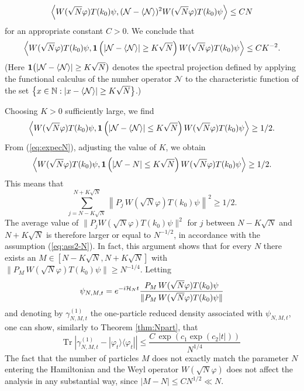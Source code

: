 \documentclass[11pt,a4paper]{article}
\newcommand{\tr}{\mbox{Tr}}
\newcommand{\cH}{{\cal H}}
\newcommand{\cN}{{\cal N}}
\newcommand{\Ncal}{\mathcal{N}}		%
\newcommand{\Nbb}{\mathbb{N}}		%
\begin{document}
\begin{itemize}
 \[ \left\langle W(\sqrt{N} \varphi) T(k_0) \psi, (\cN - \langle \cN \rangle)^2 W(\sqrt{N} \varphi) T(k_0) \psi \right\rangle \leq C N \]
for an appropriate constant $C >0$. We conclude that
\[  \left\langle W(\sqrt{N} \varphi) T(k_0) \psi,  {\bf 1} \left(| \cN -
\langle \cN \rangle | \geq K \sqrt{N} \right)  W(\sqrt{N} \varphi) T(k_0)
\psi \right\rangle \leq C K^{-2}. \]
(Here ${\bf 1} \big(| \cN - \langle \cN \rangle | \geq K \sqrt{N} \big)$ denotes the spectral projection defined by applying the functional calculus of the number operator $\Ncal$ to the characteristic function of the set $\big\{x\in \Nbb: | x -
\langle \cN \rangle | \geq K \sqrt{N}\big\}$.)

Choosing $K >0$ sufficiently large, we find
\[ \left\langle W(\sqrt{N} \varphi) T(k_0) \psi,  {\bf 1} \left(| \cN -
\langle \cN \rangle | \leq K \sqrt{N} \right)  W(\sqrt{N} \varphi) T(k_0)
\psi \right\rangle \geq 1/2. \] 
{F}rom (\ref{eq:expecN}), adjusting the value of $K$, we obtain
\[ \left\langle W(\sqrt{N} \varphi) T(k_0) \psi,  {\bf 1} \left(| \cN - N |
\leq K \sqrt{N} \right)  W(\sqrt{N} \varphi) T(k_0) \psi \right\rangle \geq
1/2. \] 
This means that
\[ \sum_{j= N - K \sqrt{N}}^{N+K \sqrt{N}} \left\| P_j \,  W(\sqrt{N} \varphi) T(k_0) \psi \right\|^2 \geq 1/2. \]
The average value of $\| P_j W (\sqrt{N} \varphi) T(k_0) \psi \|^2$ for $j$ between $N- K \sqrt{N}$ and $N+K \sqrt{N}$ is therefore larger or equal to $N^{-1/2}$, in accordance with the assumption (\ref{eq:ass2-N}). In fact, this argument shows that for every $N$ there exists an $M \in [N-K \sqrt{N} , N + K \sqrt{N}]$ with $\| P_M \, W(\sqrt{N} \varphi) T(k_0) \psi \| \geq N^{-1/4}$. Letting \[ \psi_{N,M,t} = e^{-i \cH_N t}  \frac{P_M \, W(\sqrt{N} \varphi) T(k_0) \psi}{\|  P_M \, W(\sqrt{N} \varphi) T(k_0) \psi \|} \]
and denoting by $\gamma^{(1)}_{N,M,t}$ the one-particle reduced density associated with $\psi_{N,M,t}$, one can show, similarly to Theorem \ref{thm:Npart}, that
\[ \tr \; \left| \gamma^{(1)}_{N,M,t} - |\varphi_t \rangle \langle \varphi_t| \right| \leq  \frac{C\,  \exp \left( c_1 \exp (c_2 |t|) \right)}{N^{1/4}} \]
The fact that the number of particles $M$ does not exactly match the parameter $N$ entering the Hamiltonian and the Weyl operator $W(\sqrt{N} \varphi)$ does not affect the analysis in any substantial way, since $|M - N| \leq C N^{1/2} \ll N$. 
\end{itemize}
\end{document}
